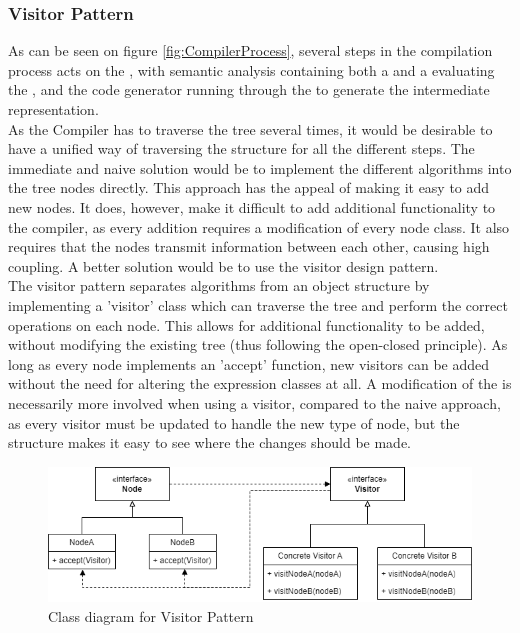 \subsubsection{Visitor Pattern}
\label{sec:VisitorDesign}

As can be seen on figure \ref{fig:CompilerProcess}, several steps in the compilation process acts on the \ast{}, with semantic analysis containing both a \typeChecker{} and a \borrowChecker{} evaluating the \ast{}, and the code generator running through the \ast{} to generate the intermediate representation.\\
As the Compiler has to traverse the tree several times, it would be desirable to have
a unified way of traversing the structure for all the different steps. The immediate
and naive solution would be to implement the different algorithms into the tree nodes
directly. This approach has the appeal of making it easy to add new nodes. It does,
however, make it difficult to add additional functionality to the compiler, as every
addition requires a modification of every node class. It also requires that the nodes
transmit information between each other, causing high coupling. A better solution
would be to use the visitor design pattern. \\

The visitor pattern separates algorithms from an object structure by implementing a 'visitor' class which can traverse the tree and perform the correct operations on each node. This allows for additional functionality to be added, without modifying the existing tree (thus following the open-closed principle). As long as every node implements an 'accept' function, new visitors can be added without the need for altering the expression classes at all. A modification of the \ast{} is necessarily more involved when using a visitor, compared to the naive approach, as every visitor must be updated to handle the new type of node, but the structure makes it easy to see where the changes should be made. 

\begin{figure}[h]
\includegraphics[width=\textwidth]{02-Body/Images/VisitorClassDiag.png}
\caption{Class diagram for Visitor Pattern}
\label{fig:VisitorClassDiagram}
\end{figure}

